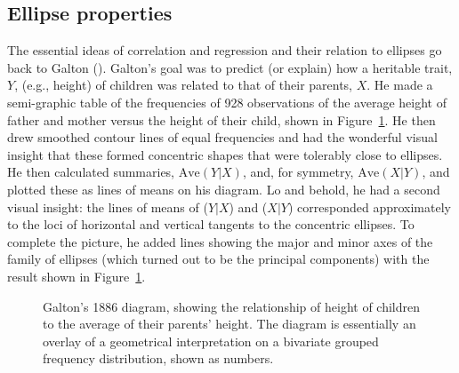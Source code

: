 \documentclass[
  letterpaper,
  10pt,
  krantz2]{krantz}
\begin{document}
\subsection{Ellipse properties}\label{ellipse-properties}

The essential ideas of correlation and regression and their relation to
ellipses go back to Galton (). Galton's
goal was to predict (or explain) how a heritable trait, \(Y\), (e.g.,
height) of children was related to that of their parents, \(X\). He made
a semi-graphic table of the frequencies of 928 observations of the
average height of father and mother versus the height of their child,
shown in Figure~\ref{fig-galton-corr}. He then drew smoothed contour
lines of equal frequencies and had the wonderful visual insight that
these formed concentric shapes that were tolerably close to ellipses. He
then calculated summaries, \(\text{Ave}(Y | X)\), and, for symmetry,
\(\text{Ave}(X | Y)\), and plotted these as lines of means on his
diagram. Lo and behold, he had a second visual insight: the lines of
means of (\(Y | X\)) and (\(X | Y\)) corresponded approximately to the
loci of horizontal and vertical tangents to the concentric ellipses. To
complete the picture, he added lines showing the major and minor axes of
the family of ellipses (which turned out to be the principal components)
with the result shown in Figure~\ref{fig-galton-corr}.

\begin{figure}


\caption{\label{fig-galton-corr}Galton's 1886 diagram, showing the
relationship of height of children to the average of their parents'
height. The diagram is essentially an overlay of a geometrical
interpretation on a bivariate grouped frequency distribution, shown as
numbers.}

\end{figure}%
\end{document}

